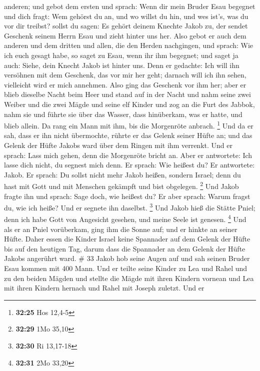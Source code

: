 anderen;  und gebot dem ersten und sprach: Wenn dir mein
Bruder Esau begegnet und dich fragt: Wem gehörst du an, und wo willst du
hin, und wes ist's, was du vor dir treibst?  sollst du
sagen: Es gehört deinem Knechte Jakob zu, der sendet Geschenk seinem
Herrn Esau und zieht hinter uns her.  Also gebot er auch
dem anderen und dem dritten und allen, die den Herden nachgingen, und
sprach: Wie ich euch gesagt habe, so saget zu Esau, wenn ihr ihm
begegnet;  und saget ja auch: Siehe, dein Knecht Jakob ist
hinter uns. Denn er gedachte: Ich will ihn versöhnen mit dem Geschenk,
das vor mir her geht; darnach will ich ihn sehen, vielleicht wird er
mich annehmen.  Also ging das Geschenk vor ihm her; aber er
blieb dieselbe Nacht beim Heer  und stand auf in der Nacht
und nahm seine zwei Weiber und die zwei Mägde und seine elf Kinder und
zog an die Furt des Jabbok,  nahm sie und führte sie über
das Wasser, dass hinüberkam, was er hatte,  und blieb
allein. Da rang ein Mann mit ihm, bis die Morgenröte anbrach.
\footnote{\textbf{32:25} Hos 12,4-5}  Und da er sah, dass
er ihn nicht übermochte, rührte er das Gelenk seiner Hüfte an; und das
Gelenk der Hüfte Jakobs ward über dem Ringen mit ihm verrenkt.
 Und er sprach: Lass mich gehen, denn die Morgenröte bricht
an. Aber er antwortete: Ich lasse dich nicht, du segnest mich denn.
 Er sprach: Wie heißest du? Er antwortete: Jakob.
 Er sprach: Du sollst nicht mehr Jakob heißen, sondern
Israel; denn du hast mit Gott und mit Menschen gekämpft und bist
obgelegen. \footnote{\textbf{32:29} 1Mo 35,10}  Und Jakob
fragte ihn und sprach: Sage doch, wie heißest du? Er aber sprach: Warum
fragst du, wie ich heiße? Und er segnete ihn daselbst. \footnote{\textbf{32:30}
  Ri 13,17-18}  Und Jakob hieß die Stätte Pniel; denn ich
habe Gott von Angesicht gesehen, und meine Seele ist genesen.
\footnote{\textbf{32:31} 2Mo 33,20}  Und als er an Pniel
vorüberkam, ging ihm die Sonne auf; und er hinkte an seiner Hüfte.
 Daher essen die Kinder Israel keine Spannader auf dem
Gelenk der Hüfte bis auf den heutigen Tag, darum dass die Spannader an
dem Gelenk der Hüfte Jakobs angerührt ward. \# 33  Jakob hob
seine Augen auf und sah seinen Bruder Esau kommen mit 400 Mann. Und er
teilte seine Kinder zu Lea und Rahel und zu den beiden Mägden
 und stellte die Mägde mit ihren Kindern vornean und Lea mit
ihren Kindern hernach und Rahel mit Joseph zuletzt.  Und er
